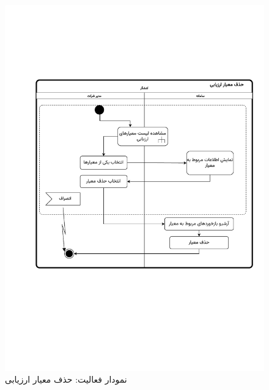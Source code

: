 \begin{figure}[ht!]
	\centering
	\includegraphics[scale=0.8, page=1]{figs/OOD-activity-deleteeval.pdf}
	\caption{نمودار فعالیت: حذف معیار ارزیابی}
\end{figure}
\FloatBarrier
\newpage

